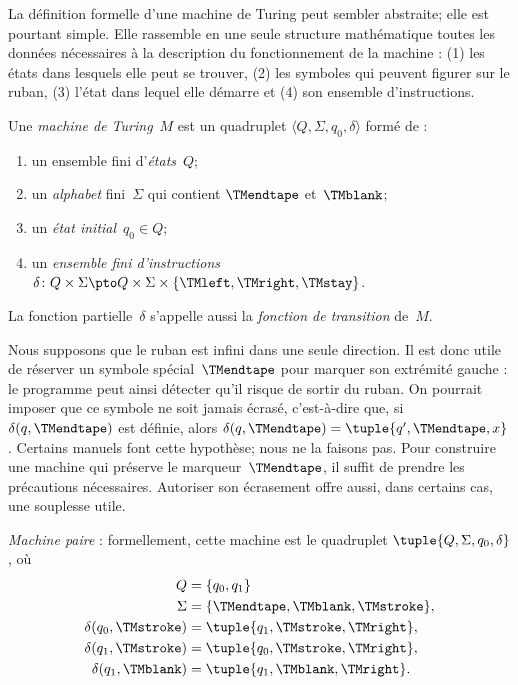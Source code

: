 \documentclass[../../../include/open-logic-section]{subfiles}
\begin{document}

\begin{explain}
La définition formelle d'une machine de Turing
peut sembler abstraite; elle est pourtant simple.
Elle rassemble en une seule structure mathématique
toutes les données nécessaires à la description
du fonctionnement de la machine : (1) les états
dans lesquels elle peut se trouver, (2) les
symboles qui peuvent figurer sur le ruban,
(3) l'état dans lequel elle démarre et
(4) son ensemble d'instructions.
\end{explain}

\begin{defn}
Une \emph{machine de Turing}~$M$ est un quadruplet
$\langle Q,\Sigma,q_0,\delta\rangle$ formé de :
\begin{enumerate}
\item un ensemble fini d'\emph{états}~$Q$;
\item un \emph{alphabet} fini~$\Sigma$ qui contient
  $\TMendtape$ et~$\TMblank$;
\item un \emph{état initial}~$q_0\in Q$;
\item un \emph{ensemble fini d'instructions}
  $\delta\colon Q\times\Sigma
  \pto Q\times\Sigma\times
  \{\TMleft,\TMright,\TMstay\}$.
\end{enumerate}
La fonction partielle~$\delta$ s'appelle aussi la
\emph{fonction de transition} de~$M$.
\end{defn}

\begin{explain}
Nous supposons que le ruban est infini dans une
seule direction. Il est donc utile de réserver
un symbole spécial~$\TMendtape$ pour marquer son
extrémité gauche : le programme peut ainsi
détecter qu'il risque de sortir du ruban. On
pourrait imposer que ce symbole ne soit jamais
écrasé, c'est-à-dire que, si
$\delta(q,\TMendtape)$ est définie, alors
$\delta(q,\TMendtape)=\tuple{q',\TMendtape,x}$.
Certains manuels font cette hypothèse; nous ne
la faisons pas. Pour construire une machine qui
préserve le marqueur~$\TMendtape$, il suffit de
prendre les précautions nécessaires. Autoriser
son écrasement offre aussi, dans certains cas,
une souplesse utile.
\end{explain}

\begin{ex}
\emph{Machine paire} : formellement, cette machine
est le quadruplet $\tuple{Q,\Sigma,q_0,\delta}$,
où
\begin{align*}
Q & = \{ q_0, q_1 \} \\
\Sigma & = \{ \TMendtape, \TMblank, \TMstroke \}, \\
\delta(q_0, \TMstroke) & = \tuple{q_1, \TMstroke, \TMright},\\
\delta(q_1, \TMstroke) & = \tuple{q_0, \TMstroke, \TMright},\\
\delta(q_1, \TMblank)  & = \tuple{q_1, \TMblank, \TMright}.
\end{align*}
\end{ex}
\end{document}
